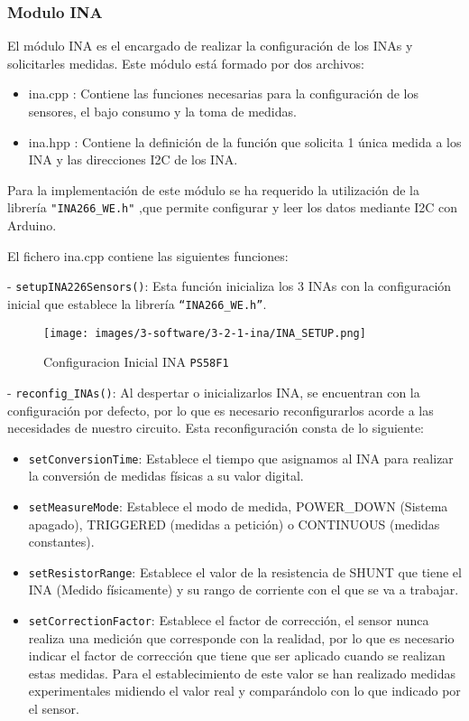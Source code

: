 \subsubsection{Modulo INA}

El módulo INA es el encargado de realizar la configuración de los INAs y solicitarles medidas.
Este módulo está formado por dos archivos:
\begin{itemize}
    \item ina.cpp : Contiene las funciones necesarias para la configuración de los sensores, el bajo consumo y la toma de medidas.
    \item ina.hpp : Contiene la definición de la función que solicita 1 única medida a los INA y las direcciones I2C de los INA.
\end{itemize}

Para la implementación de este módulo se ha requerido la utilización de la librería \texttt{"INA266\_WE.h"} ,que permite configurar y leer los datos mediante I2C con Arduino.

El fichero ina.cpp contiene las siguientes funciones:

- \texttt{setupINA226Sensors()}: Esta función inicializa los 3 INAs con la configuración inicial que establece la librería \texttt{“INA266\_WE.h”}.

\begin{figure}[H]
    \centering
    \texttt{[image: images/3-software/3-2-1-ina/INA\_SETUP.png]}
    \caption{Configuracion Inicial INA \texttt{PS58F1}}
    \label{fig:software/INA/INA_SETUP}
\end{figure}


- \texttt{reconfig\_INAs()}: Al despertar o inicializarlos INA, se encuentran con la configuración por defecto, por lo que es necesario reconfigurarlos acorde a las necesidades de nuestro circuito. Esta reconfiguración consta de lo siguiente:
\begin{itemize}
    \item \texttt{setConversionTime}: Establece el tiempo que asignamos al INA para realizar la conversión de medidas físicas a su valor digital.
    \item \texttt{setMeasureMode}: Establece el modo de medida, POWER\_DOWN (Sistema apagado), TRIGGERED (medidas a petición) o CONTINUOUS (medidas constantes).
    \item \texttt{setResistorRange}: Establece el valor de la resistencia de SHUNT que tiene el INA (Medido físicamente) y su rango de corriente con el que se va a trabajar.
    \item \texttt{setCorrectionFactor}: Establece el factor de corrección, el sensor nunca realiza una medición que corresponde con la realidad, por lo que es necesario indicar el factor de corrección que tiene que ser aplicado cuando se realizan estas medidas. Para el establecimiento de este valor se han realizado medidas experimentales midiendo el valor real y comparándolo con lo que indicado por el sensor.
\end{itemize}

